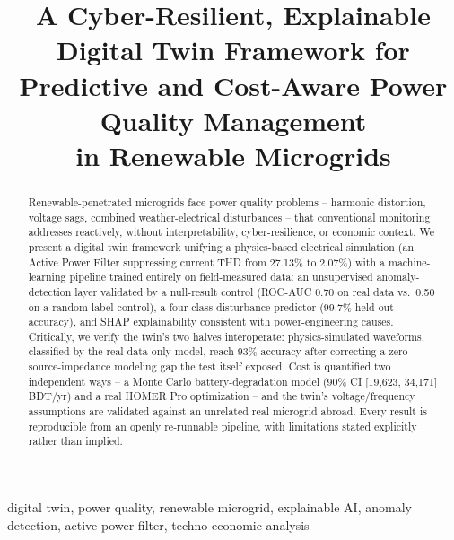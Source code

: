 \documentclass[conference,a4paper]{IEEEtran}
\begin{document}
\sloppy

\title{A Cyber-Resilient, Explainable Digital Twin Framework for\\
Predictive and Cost-Aware Power Quality Management\\
in Renewable Microgrids}

\author{
}

\maketitle

\begin{abstract}
Renewable-penetrated microgrids face power quality problems --
harmonic distortion, voltage sags, combined weather-electrical
disturbances -- that conventional monitoring addresses reactively,
without interpretability, cyber-resilience, or economic context. We
present a digital twin framework unifying a physics-based electrical
simulation (an Active Power Filter suppressing current THD from
27.13\% to 2.07\%) with a machine-learning pipeline trained entirely
on field-measured data: an unsupervised anomaly-detection layer
validated by a null-result control (ROC-AUC 0.70 on real data vs.\
0.50 on a random-label control), a four-class disturbance predictor
(99.7\% held-out accuracy), and SHAP explainability consistent with
power-engineering causes. Critically, we verify the twin's two halves
interoperate: physics-simulated waveforms, classified by the
real-data-only model, reach 93\% accuracy after correcting a
zero-source-impedance modeling gap the test itself exposed. Cost is
quantified two independent ways -- a Monte Carlo battery-degradation
model (90\% CI [19{,}623, 34{,}171] BDT/yr) and a real HOMER Pro
optimization -- and the twin's voltage/frequency assumptions are
validated against an unrelated real microgrid abroad. Every result is
reproducible from an openly re-runnable pipeline, with limitations
stated explicitly rather than implied.
\end{abstract}

\begin{IEEEkeywords}
digital twin, power quality, renewable microgrid, explainable AI,
anomaly detection, active power filter, techno-economic analysis
\end{IEEEkeywords}
\end{document}
